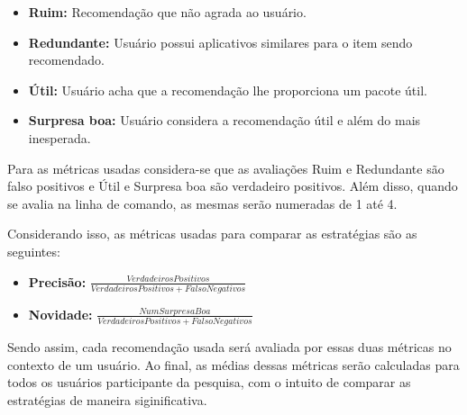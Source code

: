 \begin{itemize}
    \item \textbf{Ruim: } Recomendação que não agrada ao usuário.
    \item \textbf{Redundante: } Usuário possui aplicativos similares para o item
        sendo recomendado.
    \item \textbf{Útil: } Usuário acha que a recomendação lhe proporciona um
            pacote útil.
    \item \textbf{Surpresa boa: } Usuário considera a recomendação útil e além
        do mais inesperada.
\end{itemize}

Para as métricas usadas considera-se que as avaliações Ruim e Redundante são
falso positivos e Útil e Surpresa boa são verdadeiro positivos. Além disso,
quando se avalia na linha de comando, as mesmas serão numeradas de 1 até 4.

Considerando isso, as métricas usadas para comparar as estratégias são as
seguintes:

\begin{itemize}
    \item \textbf{Precisão: } $\frac{VerdadeirosPositivos}{VerdadeirosPositivos
        + FalsoNegativos}$
    \item \textbf{Novidade: } $\frac{NumSurpresaBoa}{VerdadeirosPositivos +
        FalsoNegativos}$
\end{itemize}

Sendo assim, cada recomendação usada será avaliada por essas duas métricas no
contexto de um usuário. Ao final, as médias dessas métricas serão calculadas para
todos os usuários participante da pesquisa, com o intuito de comparar as
estratégias de maneira siginificativa.
